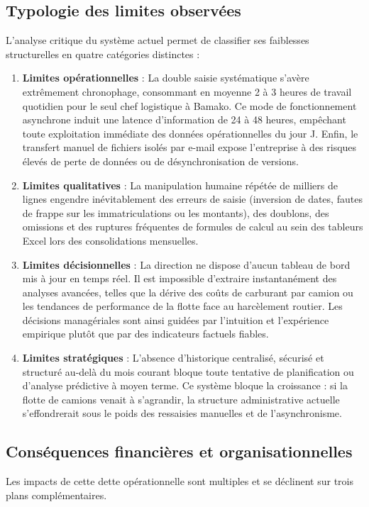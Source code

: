 \subsection{Typologie des limites observées}
L'analyse critique du système actuel permet de classifier ses faiblesses structurelles en quatre catégories distinctes :
\begin{enumerate}
    \item \textbf{Limites opérationnelles} : La double saisie systématique s'avère extrêmement chronophage, consommant en moyenne 2 à 3 heures de travail quotidien pour le seul chef logistique à Bamako. Ce mode de fonctionnement asynchrone induit une latence d'information de 24 à 48 heures, empêchant toute exploitation immédiate des données opérationnelles du jour J. Enfin, le transfert manuel de fichiers isolés par e-mail expose l'entreprise à des risques élevés de perte de données ou de désynchronisation de versions.
    \item \textbf{Limites qualitatives} : La manipulation humaine répétée de milliers de lignes engendre inévitablement des erreurs de saisie (inversion de dates, fautes de frappe sur les immatriculations ou les montants), des doublons, des omissions et des ruptures fréquentes de formules de calcul au sein des tableurs Excel lors des consolidations mensuelles.
    \item \textbf{Limites décisionnelles} : La direction ne dispose d'aucun tableau de bord mis à jour en temps réel. Il est impossible d'extraire instantanément des analyses avancées, telles que la dérive des coûts de carburant par camion ou les tendances de performance de la flotte face au harcèlement routier. Les décisions managériales sont ainsi guidées par l'intuition et l'expérience empirique plutôt que par des indicateurs factuels fiables.
    \item \textbf{Limites stratégiques} : L'absence d’historique centralisé, sécurisé et structuré au-delà du mois courant bloque toute tentative de planification ou d'analyse prédictive à moyen terme. Ce système bloque la croissance : si la flotte de camions venait à s'agrandir, la structure administrative actuelle s'effondrerait sous le poids des ressaisies manuelles et de l'asynchronisme.
\end{enumerate}

\subsection{Conséquences financières et organisationnelles}
Les impacts de cette dette opérationnelle sont multiples et se déclinent sur trois plans complémentaires.


